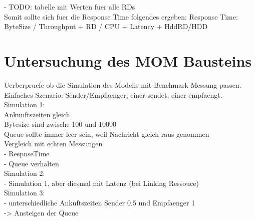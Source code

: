 - TODO: tabelle mit Werten fuer alle RDs\\

Somit sollte sich fuer die Response Time folgendes ergeben: Response Time: ByteSize / Throughput + RD / CPU + Latency + HddRD/HDD \\









\section{Untersuchung des MOM Bausteins}
Uerberpruefe ob die Simulation des Modells mit Benchmark Messung passen.\\

Einfaches Szenario: Sender/Empfaenger, einer sendet, einer empfaengt.\\



Simulation 1: \\
Ankunftszeiten gleich \\
Bytesize sind zwische 100 und 10000 \\
Queue sollte immer leer sein, weil Nachricht gleich raus genommen \\
Vergleich mit echten Messungen \\
- RespnseTime \\
- Queue verhalten \\

Simulation 2: \\
- Simulation 1, aber diesmal mit Latenz (bei Linking Ressouce)\\

Simulation 3: \\
- unterschiedliche Ankuftszeiten Sender 0.5 und Empfaenger 1 \\
-> Ansteigen der Queue \\


